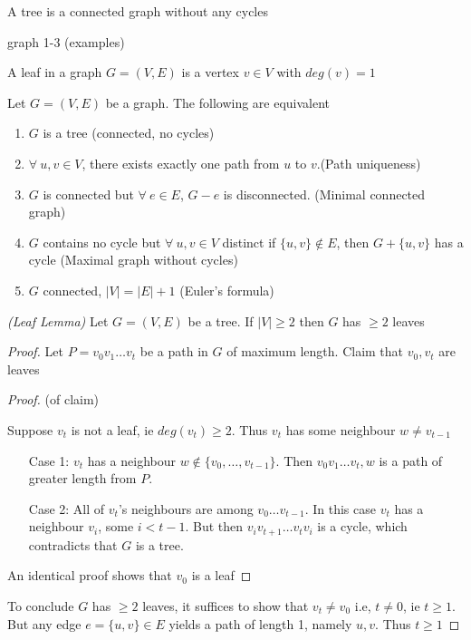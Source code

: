 \documentclass{article}
\begin{document}
\begin{defn}
A tree is a connected graph without any cycles
\end{defn}

graph 1-3 (examples)

\begin{defn}
A leaf in a graph $G=(V,E)$ is a vertex $v \in V$ with $deg(v)=1$
\end{defn}

\begin{thm}
\label{gtree}
Let $G=(V,E)$ be a graph.  The following are equivalent
\begin{enumerate}
\item $G$ is a tree (connected, no cycles)
\item $\forall ~ u,v \in V$, there exists exactly one path from $u$ to $v$.(Path uniqueness)
\item $G$ is connected but $\forall ~ e \in E$, $G - e $ is disconnected. (Minimal connected graph)
\item $G$ contains no cycle but $\forall ~ u, v \in V$ distinct if $\{u,v\} \notin E$, then $G + \{u,v\}$ has a cycle (Maximal graph without cycles)
\item $G$ connected, $|V| = |E|+1$ (Euler's formula)
\end{enumerate}
\end{thm}

\begin{lem}
\label{leaflem}
\emph{(Leaf Lemma)} Let $G=(V,E)$ be a tree. If $|V| \geq 2$ then $G$ has $\geq 2$ leaves
\end{lem}

\begin{proof}
Let $P= v_0 v_1 \ldots v_t$ be a path in $G$ of maximum length.  Claim that $v_0, v_t$ are leaves

\begin{proof}
(of claim)

Suppose  $v_t$ is not a leaf, ie $deg(v_t)\ge 2$.  Thus $v_t$ has some neighbour $w \neq v_{t-1}$
\begin{itemize}
\item[Case 1:] $v_t$ has a neighbour $w \notin \{v_0, \ldots, v_{t-1}\}$.  Then $v_0 v_1 \ldots v_t, w$ is a path of greater length from $P$.
\item[Case 2:] All of $v_t$'s neighbours are among $v_0 \ldots v_{t-1}$.  In this case $v_t$ has a neighbour $v_i$, some $i < t-1$.  But then $v_i v_{t+1} \ldots v_t v_i$ is a cycle, which contradicts that $G$ is a tree.
\end{itemize} An identical proof shows that $v_0$ is a leaf
\end{proof}
To conclude $G$ has $\ge 2$ leaves, it suffices to show that $v_t \neq v_0$ i.e, $t \neq 0$, ie $t \ge 1$.  But any edge $e = \{u, v\} \in E$ yields a path of length 1, namely $u, v$.  Thus $t\ge 1$
\end{proof}
\end{document}
